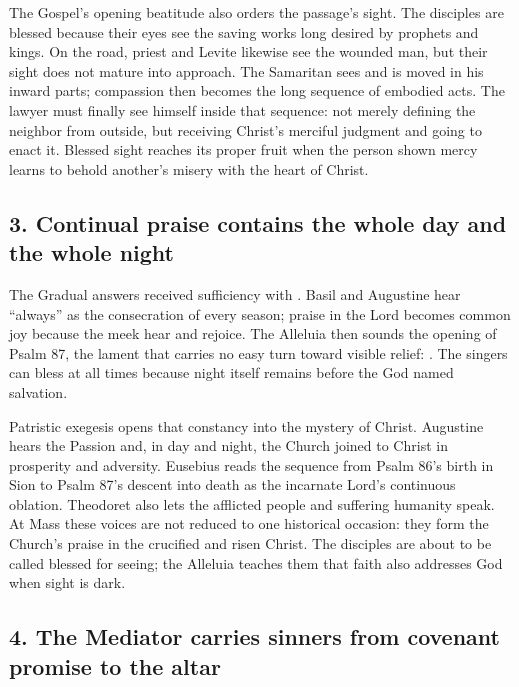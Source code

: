 The Gospel's opening beatitude also orders the passage's sight. The disciples
are blessed because their eyes see the saving works long desired by prophets
and kings. On the road, priest and Levite likewise see the wounded man, but
their sight does not mature into approach. The Samaritan sees and is moved in
his inward parts; compassion then becomes the long sequence of embodied acts.
The lawyer must finally see himself inside that sequence: not merely defining
the neighbor from outside, but receiving Christ's merciful judgment and going
to enact it. Blessed sight reaches its proper fruit when the person shown
mercy learns to behold another's misery with the heart of Christ.

\clearpage

\subsection*{3. Continual praise contains the whole day and the whole night }

The Gradual answers received sufficiency with . Basil and Augustine hear ``always'' as the consecration of every
season; praise in the Lord becomes common joy because the meek hear and rejoice.
The Alleluia then sounds the opening of Psalm 87, the lament that carries no
easy turn toward visible relief: . The singers can bless at all times because night
itself remains before the God named salvation.

Patristic exegesis opens that constancy into the mystery of Christ. Augustine
hears the Passion and, in day and night, the Church joined to Christ in
prosperity and adversity. Eusebius reads the sequence from Psalm 86's birth in
Sion to Psalm 87's descent into death as the incarnate Lord's continuous
oblation. Theodoret also lets the afflicted people and suffering humanity
speak. At Mass these voices are not reduced to one historical occasion: they
form the Church's praise in the crucified and risen Christ. The disciples are
about to be called blessed for seeing; the Alleluia teaches them that faith
also addresses God when sight is dark.

\subsection*{4. The Mediator carries sinners from covenant promise to the altar }

